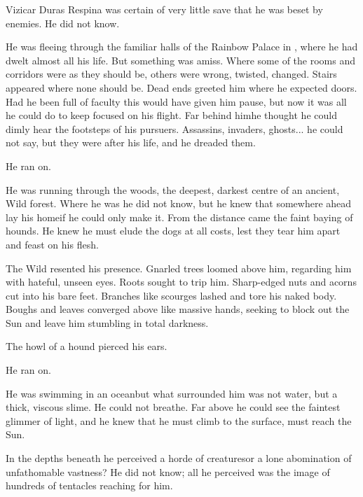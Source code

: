 
Vizicar Duras Respina was certain of very little save that he was beset by enemies.  He did not know. 

He was fleeing through the familiar halls of the Rainbow Palace in \Merodar, where he had dwelt almost all his life. But something was amiss. Where some of the rooms and corridors were as they should be, others were wrong, twisted, changed. Stairs appeared where none should be. Dead ends greeted him where he expected doors. Had he been full of faculty this would have given him pause, but now it was all he could do to keep focused on his flight. Far behind him\dash{}\dash he thought he could dimly hear the footsteps of his pursuers. Assassins, invaders, ghosts... he could not say, but they were after his life, and he dreaded them. 

He ran on.

He was running through the woods, the deepest, darkest centre of an ancient, Wild forest. Where he was he did not know, but he knew that somewhere ahead lay his home\dash if he could only make it. From the distance came the faint baying of hounds.  He knew he must elude the dogs at all costs, lest they tear him apart and feast on his flesh. 

The Wild resented his presence. Gnarled trees loomed above him, regarding him with hateful, unseen eyes. Roots sought to trip him. Sharp-edged nuts and acorns cut into his bare feet. Branches like scourges lashed and tore his naked body. Boughs and leaves converged above like massive hands, seeking to block out the Sun and leave him stumbling in total darkness. 

The howl of a hound pierced his ears.  

He ran on. 

He was swimming in an ocean\dash but what surrounded him was not water, but a thick, viscous slime. He could not breathe. Far above he could see the faintest glimmer of light, and he knew that he must climb to the surface, must reach the Sun. 

In the depths beneath he perceived a horde of creatures\dash or a lone abomination of unfathomable vastness? He did not know; all he perceived was the image of hundreds of tentacles reaching for him. 

